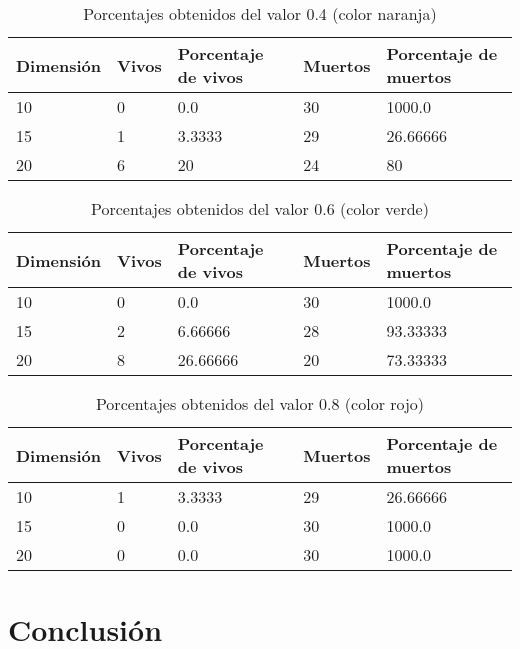 \documentclass{article}
\begin{document}
 \begin{table}[h]
 \caption{Porcentajes obtenidos del valor 0.4 (color naranja)}
\centering
\begin{tabular}{ |p{2cm}||p{2cm}|p{2cm}|p{2cm}|p{2cm  }|}
\hline
 Dimensión & Vivos & Porcentaje de vivos & Muertos & Porcentaje de muertos \\
 \hline
 10   & 0      & 0.0 & 30      & 1000.0\\
 15  & 1      & 3.3333  & 29      & 26.66666\\
 20   & 6      & 20  & 24      & 80 \\
 \hline
\end{tabular}
\label{table:1}
\end{table}
 
 \begin{table}[h]
 \caption{Porcentajes obtenidos del valor 0.6 (color verde)}
\centering
\begin{tabular}{ |p{2cm}||p{2cm}|p{2cm}|p{2cm}|p{2cm  }|}
\hline
Dimensión & Vivos & Porcentaje de vivos & Muertos & Porcentaje de muertos \\
 \hline
 10  & 0     & 0.0      & 30   &     1000.0\\
 15  & 2     & 6.66666  & 28   &     93.33333\\
 20  & 8     & 26.66666 & 20   &     73.33333 \\
 \hline
 
\end{tabular}
\label{table:1}
\end{table}
 
 \begin{table}[h]
 \caption{Porcentajes obtenidos del valor 0.8 (color rojo)}
\centering
\begin{tabular}{ |p{2cm}||p{2cm}|p{2cm}|p{2cm}|p{2cm  }|}
 \hline
Dimensión & Vivos & Porcentaje de vivos & Muertos & Porcentaje de muertos \\

 \hline
 10  & 1      & 3.3333  & 29      & 26.66666\\
 15  & 0     & 0.0      & 30   &     1000.0\\
 20  & 0     & 0.0      & 30   &     1000.0 \\
 \hline
 
\end{tabular}
\label{table:1}
\end{table}
 
 \newpage
 

 \section{Conclusión}
\end{document}
